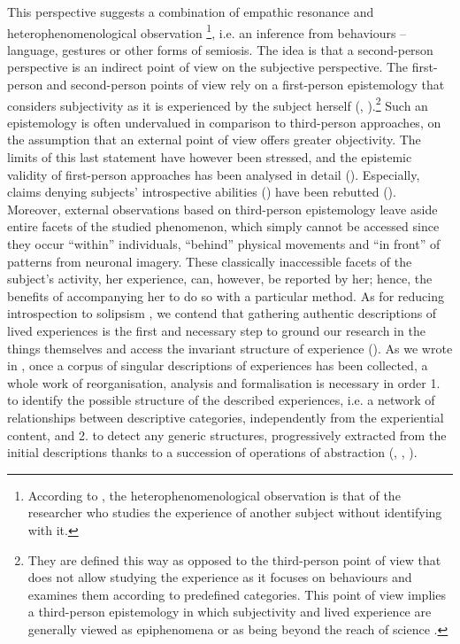 \documentclass[output=paper]{langscibook}
\begin{document}
This perspective suggests a combination of empathic resonance and heterophenomenological observation \citep{Depraz2012}\footnote{According to \citet[419]{Depraz2012}, the heterophenomenological observation is that of the researcher who studies the experience of another subject without identifying with it.}, i.e. an inference from behaviours – language, gestures or other forms of semiosis. The idea is that a second-person perspective is an indirect point of view on the subjective perspective. The first-person and second-person points of view rely on a first-person epistemology that considers subjectivity as it is experienced by the subject herself (\citealt{VarelaShear1999}, \citealt{Depraz2014}).\footnote{They are defined this way as opposed to the third-person point of view that does not allow studying the experience as it focuses on behaviours and examines them according to predefined categories. This point of view implies a third-person epistemology in which subjectivity and lived experience are generally viewed as epiphenomena or as being beyond the reach of science \citep{Vermersch2000a}.} Such an epistemology is often undervalued in comparison to third-person approaches, on the assumption that an external point of view offers greater objectivity. The limits of this last statement have however been stressed, and the epistemic validity of first-person approaches has been analysed in detail (\citealt{PetitmenginBitbol2009}). Especially, claims denying subjects’ introspective abilities (\citealt{NisbettWilson1977}) have been rebutted (\citealt{PetitmenginBitbol2009, PetitmenginEtAl2013}). Moreover, external observations based on third-person epistemology leave aside entire facets of the studied phenomenon, which simply cannot be accessed since they occur “within” individuals, “behind” physical movements and “in front” of patterns from neuronal imagery. These classically inaccessible facets of the subject’s activity, her experience, can, however, be reported by her; hence, the benefits of accompanying her to do so with a particular method. As for reducing introspection to solipsism \citep[10]{Zahavi2017}, we contend that gathering authentic descriptions of lived experiences is the first and necessary step to ground our research in the things themselves and access the invariant structure of experience (\citealt[36]{BitbolPetitmengin2011}). As we wrote in \citet{PetitmenginEtAl2015}, once a corpus of singular descriptions of experiences has been collected, a whole work of reorganisation, analysis and formalisation is necessary in order 1. to identify the possible structure of the described experiences, i.e. a network of relationships between descriptive categories, independently from the experiential content, and 2. to detect any generic structures, progressively extracted from the initial descriptions thanks to a succession of operations of abstraction (\citealt{Ollagnier-BeldameCoupe2019}, \citealt{PetitmenginEtAl2018}, \citealt{ValenzuelaRosati2019}).
\end{document}
